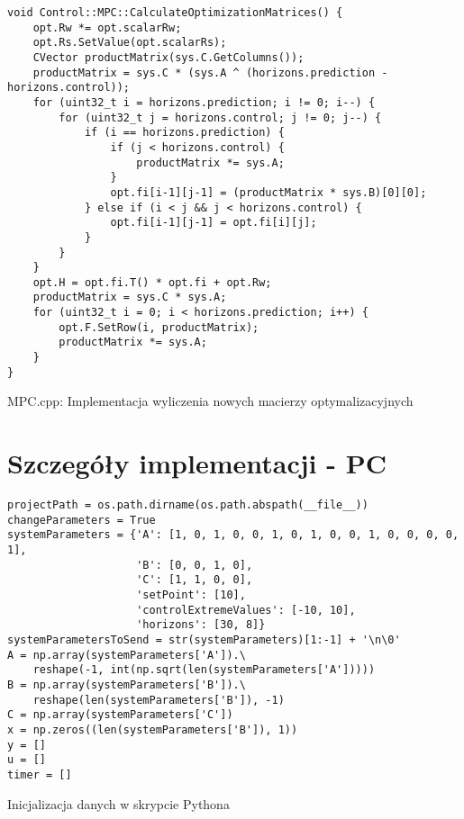 \begin{listing}[htb]
\begin{verbatim}
void Control::MPC::CalculateOptimizationMatrices() {
    opt.Rw *= opt.scalarRw;
    opt.Rs.SetValue(opt.scalarRs);
    CVector productMatrix(sys.C.GetColumns());
    productMatrix = sys.C * (sys.A ^ (horizons.prediction - horizons.control));
    for (uint32_t i = horizons.prediction; i != 0; i--) {
        for (uint32_t j = horizons.control; j != 0; j--) {
            if (i == horizons.prediction) {
                if (j < horizons.control) {
                    productMatrix *= sys.A;
                }
                opt.fi[i-1][j-1] = (productMatrix * sys.B)[0][0];
            } else if (i < j && j < horizons.control) {
                opt.fi[i-1][j-1] = opt.fi[i][j];
            }
        }
    }
    opt.H = opt.fi.T() * opt.fi + opt.Rw;
    productMatrix = sys.C * sys.A;
    for (uint32_t i = 0; i < horizons.prediction; i++) {
        opt.F.SetRow(i, productMatrix);
        productMatrix *= sys.A;
    }
}
\end{verbatim}
\caption{MPC.cpp: Implementacja wyliczenia nowych macierzy optymalizacyjnych}
\label{lst:opt_cpp}
\end{listing}

\section{Szczegóły implementacji - PC} \label{sec:details-pc}
\begin{listing}[htb]
\begin{verbatim}
projectPath = os.path.dirname(os.path.abspath(__file__))
changeParameters = True
systemParameters = {'A': [1, 0, 1, 0, 0, 1, 0, 1, 0, 0, 1, 0, 0, 0, 0, 1],
                    'B': [0, 0, 1, 0],
                    'C': [1, 1, 0, 0],
                    'setPoint': [10],
                    'controlExtremeValues': [-10, 10],
                    'horizons': [30, 8]}
systemParametersToSend = str(systemParameters)[1:-1] + '\n\0'
A = np.array(systemParameters['A']).\
    reshape(-1, int(np.sqrt(len(systemParameters['A']))))
B = np.array(systemParameters['B']).\
    reshape(len(systemParameters['B']), -1)
C = np.array(systemParameters['C'])
x = np.zeros((len(systemParameters['B']), 1))
y = []
u = []
timer = []
\end{verbatim}
\caption{Inicjalizacja danych w skrypcie Pythona}
\label{lst:init_py}
\end{listing}

